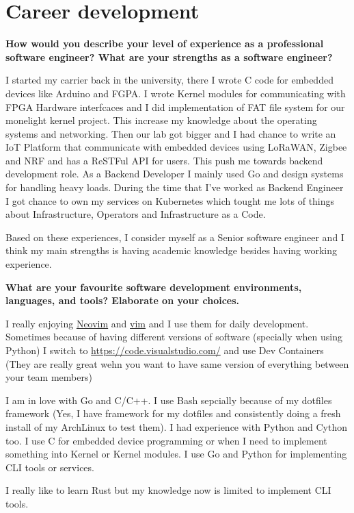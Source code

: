 \section{Career development}

\textbf{How would you describe your level of experience as a professional software engineer?
What are your strengths as a software engineer?}

I started my carrier back in the university, there I wrote C code for embedded devices like Arduino and FGPA.
I wrote Kernel modules for communicating with FPGA Hardware interfcaces and I did implementation of FAT file system
for our monelight kernel project.
This increase my knowledge about the operating systems and networking. Then our lab got bigger and I had chance
to write an IoT Platform that communicate with embedded devices using LoRaWAN, Zigbee and NRF and has a ReSTFul
API for users. This push me towards backend development role. As a Backend Developer I mainly used Go and design
systems for handling heavy loads. During the time that I've worked as Backend Engineer I got chance to own my services
on Kubernetes which tought me lots of things about Infrastructure, Operators and Infrastructure as a Code.

Based on these experiences, I consider myself as a Senior software engineer and I think my main strengths is having
academic knowledge besides having working experience.

\textbf{What are your favourite software development environments, languages, and tools? Elaborate on your choices.}

I really enjoying \href{https://neovim.io/}{Neovim} and \href{https://www.vim.org/}{vim} and I use them for daily development.
Sometimes because of having different versions of software (specially when using Python) I switch to \href{VSCode}{https://code.visualstudio.com/}
and use Dev Containers (They are really great wehn you want to have same version of everything between your team members)

I am in love with Go and C/C++. I use Bash sepcially because of my dotfiles framework (Yes, I have framework for my dotfiles
and consistently doing a fresh install of my ArchLinux to test them). I had experience with
Python and Cython too. I use C for embedded device programming or when I need to implement something into
Kernel or Kernel modules. I use Go and Python for implementing CLI tools or services.

I really like to learn Rust but my knowledge now is limited to implement CLI tools.

